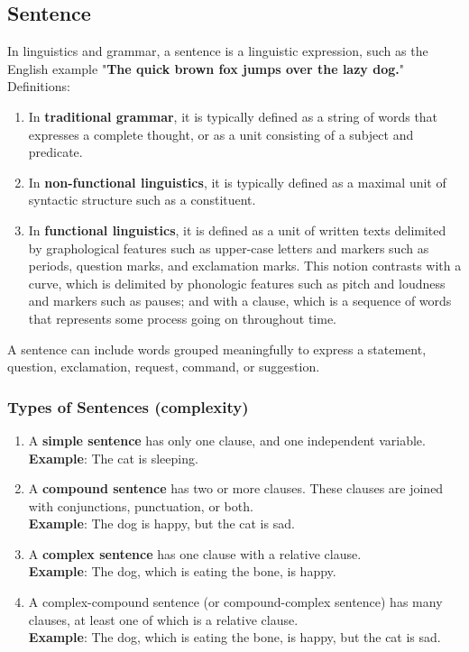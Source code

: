 \subsection{Sentence \cite{wiki-sentence-linguistics,wiki-sentence}}\label{Language: Sentence}
In linguistics and grammar, a sentence is a linguistic expression, such as the English example "\textbf{The quick brown fox jumps over the lazy dog.}" \\
Definitions:
\begin{enumerate}
    \item In \textbf{traditional grammar}, it is typically defined as a string of words that expresses a complete thought, or as a unit consisting of a subject and predicate.
    \item In \textbf{non-functional linguistics}, it is typically defined as a maximal unit of syntactic structure such as a constituent.
    \item In \textbf{functional linguistics}, it is defined as a unit of written texts delimited by graphological features such as upper-case letters and markers such as periods, question marks, and exclamation marks. This notion contrasts with a curve, which is delimited by phonologic features such as pitch and loudness and markers such as pauses; and with a clause, which is a sequence of words that represents some process going on throughout time.
\end{enumerate}

A sentence can include words grouped meaningfully to express a statement, question, exclamation, request, command, or suggestion.


\subsubsection{Types of Sentences (complexity)}
\begin{enumerate}
    \item A \textbf{simple sentence} has only one clause, and one independent variable.\\ \textbf{Example}: The cat is sleeping.
    \item A \textbf{compound sentence} has two or more clauses. These clauses are joined with conjunctions, punctuation, or both.\\ \textbf{Example}: The dog is happy, but the cat is sad.
    \item A \textbf{complex sentence} has one clause with a relative clause. \\ \textbf{Example}: The dog, which is eating the bone, is happy.
    \item A complex-compound sentence (or compound-complex sentence) has many clauses, at least one of which is a relative clause.\\ \textbf{Example}: The dog, which is eating the bone, is happy, but the cat is sad.
\end{enumerate}

